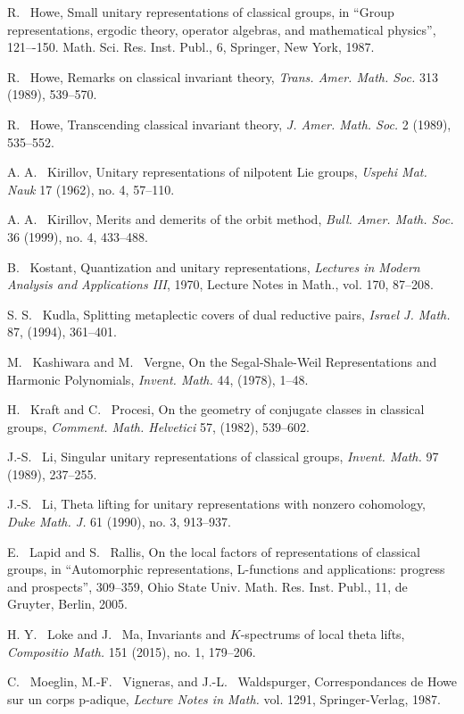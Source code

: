 \documentclass[lang = american]{ems-icm} %
\numberwithin{equation}{section}
\theoremstyle{remark}
\begin{document}
\begin{thebibliography}{99}
R. ~Howe, Small unitary representations of classical groups, in ``Group representations, ergodic theory, operator algebras, and mathematical physics'', 121–-150.
Math. Sci. Res. Inst. Publ., 6, Springer, New York, 1987.


R. ~Howe, Remarks on classical invariant theory, \emph{Trans. Amer. Math. Soc.} 313 (1989), 539--570.

R. ~Howe, Transcending classical invariant theory, \emph{J. Amer. Math. Soc.} 2 (1989), 535--552.

A. A. ~Kirillov, Unitary representations of nilpotent Lie groups, \emph{Uspehi Mat. Nauk} 17 (1962), no. 4, 57--110.

A. A. ~Kirillov, Merits and demerits of the orbit method, \emph{Bull. Amer. Math. Soc.} 36 (1999), no. 4, 433--488.

B. ~Kostant, Quantization and unitary representations, \emph{Lectures in Modern Analysis and Applications III}, 1970, Lecture Notes in Math., vol. 170, 87--208.

S. S. ~Kudla, Splitting metaplectic covers of dual reductive
pairs, \emph{Israel J. Math.} 87, (1994), 361--401.

M. ~Kashiwara and M. ~Vergne, On the Segal-Shale-Weil Representations and Harmonic Polynomials, \emph{Invent. Math.} 44, (1978), 1--48.

H. ~Kraft and C. ~Procesi, On the geometry of conjugate classes in classical groups, \emph{Comment. Math. Helvetici} 57, (1982), 539--602.


J.-S. ~Li,
Singular unitary representations of classical groups,
\emph{Invent. Math.} 97 (1989), 237--255.


J.-S. ~Li,
Theta lifting for unitary representations with nonzero cohomology,
\emph{Duke Math. J.} 61 (1990), no. 3, 913--937.


E. ~Lapid and S. ~Rallis, On the local factors of representations of classical groups, in ``Automorphic representations, L-functions and applications: progress and prospects'', 309--359, Ohio State Univ. Math. Res. Inst. Publ., 11, de Gruyter, Berlin, 2005.

H. Y. ~Loke and J. ~Ma,
Invariants and $K$-spectrums of local theta lifts,
\emph{Compositio Math.} 151 (2015), no. 1, 179--206.


C. ~Moeglin, M.-F. ~Vigneras, and J.-L. ~Waldspurger,
Correspondances de Howe sur un corps p-adique, \emph{Lecture Notes
in Math.} vol. 1291, Springer-Verlag, 1987.



\end{thebibliography}
\end{document}
